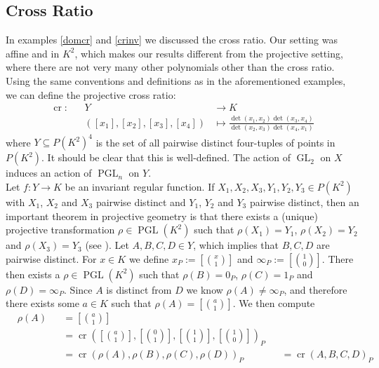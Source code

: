 \subsection{Cross Ratio}
In examples \ref{domcr} and \ref{crinv} we discussed the cross ratio.
Our setting was affine and in $K^2$, which makes our results different from the projective setting, where there are not very many other polynomials other than the cross ratio.  \\
Using the same conventions and definitions as in the aforementioned examples, we can define the projective cross ratio:
\begin{equation}
  \begin{aligned}
    \operatorname{cr} \colon&&Y&\longrightarrow K \\
    &&([x_1],[x_2],[x_3],[x_4]) &\longmapsto \frac{\operatorname{det}(x_1,x_2)\operatorname{det}(x_3,x_4)}{\operatorname{det}(x_2,x_3)\operatorname{det}(x_4,x_1)}
  \end{aligned}
\end{equation}
where $Y \subseteq P(K^2)^4$ is the set of all pairwise distinct four-tuples of points in $P(K^2)$.
It should be clear that this is well-defined.
The action of $\operatorname{GL}_2$ on $X$ induces an action of $\operatorname{PGL}_n$ on $Y$.  \\
Let $f \colon Y \longrightarrow K$ be an invariant regular function.
If $X_1,X_2,X_3,Y_1,Y_2,Y_3 \in P(K^2)$ with $X_1$, $X_2$ and $X_3$ pairwise distinct and $Y_1$, $Y_2$ and $Y_3$ pairwise distinct, then an important theorem in projective geometry is that there exists a (unique) projective transformation $ \rho \in \operatorname{PGL}(K^2)$ such that $\rho (X_1) = Y_1$, $\rho(X_2) = Y_2$ and $\rho(X_3) = Y_3$ (see \cite[prop 5.6]{Aud03}).
  Let $A,B,C,D \in Y$, which implies that $B,C,D$ are pairwise distinct.
  For $x \in K $ we define $x_P := \left[\binom{x}{1}\right]$ and $\infty_P := \left[\binom{1}{0}\right]$.
  There then exists a $\rho \in \operatorname{PGL}(K^2)$ such that $\rho (B) = 0_P$, $\rho (C) = 1_P$ and $\rho (D) = \infty_P$.
  Since $A$ is distinct from $D$ we know $\rho (A) \neq \infty_P$, and therefore there exists some $a \in K$ such that $\rho(A) = [\binom{a}{1}]$.
  We then compute
  \begin{equation}
    \begin{aligned}
      &\rho (A)
      &&= \left[\binom{a}{1}\right]\\
      &&&= \operatorname{cr}\left(\left[\binom{a}{1}\right],\left[\binom{0}{1}\right],\left[\binom{1}{1}\right],\left[\binom{1}{0}\right]\right)_P\\
      &&&= \operatorname{cr}(\rho(A),\rho(B),\rho(C),\rho(D))_P &&= \operatorname{cr}(A,B,C,D)_P
    \end{aligned}
  \end{equation}
